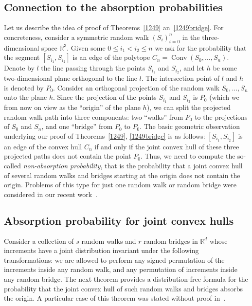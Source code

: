 \documentclass[12pt, reqno]{amsart}
\theoremstyle{plain}
\theoremstyle{definition}
\theoremstyle{remark}
\begin{document}
\subsection{Connection to the absorption probabilities}
Let us describe the idea of proof of Theorems~\ref{1249} an~\ref{1249bridge}. For concreteness, consider a symmetric random walk $(S_i)_{i=0}^n$ in the three-dimensional space ${\mathbb{R}}^3$. Given some $0\leq i_1 < i_2 \leq n$ we ask for the probability that the segment $[S_{i_1},S_{i_2}]$ is an edge of the polytope $C_n = {\mathop{\mathrm{Conv}}\nolimits}(S_0,\ldots,S_n)$. Denote by $l$ the line passing through the points $S_{i_1}$ and $S_{i_2}$, and let $h$ be some two-dimensional plane orthogonal to the line $l$. The intersection point of $l$ and $h$ is denoted by $P_0$.
Consider an orthogonal projection of the random walk $S_0,\ldots,S_n$ onto the plane $h$. Since the projection of the points $S_{i_1}$ and $S_{i_2}$ is $P_0$ (which we from now on view as the ``origin'' of the plane $h$),  we can split the projected random walk path into three components: two ``walks'' from $P_0$ to the projections of $S_0$ and $S_n$, and one ``bridge'' from $P_0$ to $P_0$. The basic geometric observation underlying our proof of Theorems~\ref{1249}, \ref{1249bridge} is as follows: $[S_{i_1},S_{i_2}]$ is an edge of the convex hull $C_n$ if and only if the joint convex hull of these three projected paths does not contain the point $P_0$.
Thus, we need to compute the so-called \textit{non-absorption probability}, that is the probability that a joint convex hull of several random walks and bridges starting at the origin does not contain the origin. Problems of this type for just one random walk or random bridge were considered in our recent work~\cite{KVZ15}.

\subsection{Absorption probability for joint convex hulls}
Consider a collection of $s$ random walks and $r$ random bridges in ${\mathbb{R}}^d$ whose increments have a joint distribution invariant under the following transformations: we are allowed to perform any signed permutation of the increments inside any random walk, and any permutation of increments inside any random bridge. The next theorem provides a distribution-free formula for the probability that the joint convex hull of such random walks and bridges absorbs the origin. A particular case of this theorem was stated without proof in~\cite[Theorem~2.7]{KVZ15}.
\end{document}
